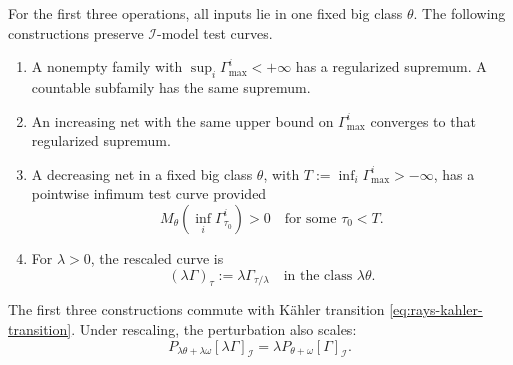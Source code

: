\begin{proposition}\label{prop:rays-test-limits}
For the first three operations, all inputs lie in one fixed big class
$\theta$. The following constructions preserve $\mathcal I$-model
test curves.
\begin{enumerate}
\item A nonempty family with
      $\sup_i\Gamma^i_{\max}<+\infty$ has a regularized supremum.
      A countable subfamily has the same supremum.
\item An increasing net with the same upper bound on
      $\Gamma^i_{\max}$ converges to that regularized supremum.
\item A decreasing net in a fixed big class $\theta$, with
      $T:=\inf_i\Gamma^i_{\max}>-\infty$, has a pointwise infimum
      test curve provided
      \[
       M_\theta\!\left(\inf_i\Gamma^i_{\tau_0}\right)>0
                    \quad\text{for some }\tau_0<T.
      \]
\item For $\lambda>0$, the rescaled curve is
      \[
      (\lambda\Gamma)_\tau
          :=\lambda\Gamma_{\tau/\lambda}
      \quad\text{in the class }\lambda\theta.
      \tag{52.26}\label{eq:rays-test-rescaling}
      \]
\end{enumerate}
The first three constructions commute with K\"ahler transition
\eqref{eq:rays-kahler-transition}. Under rescaling, the perturbation
also scales:
\[
 P_{\lambda\theta+\lambda\omega}[\lambda\Gamma]_{\mathcal I}
 =\lambda P_{\theta+\omega}[\Gamma]_{\mathcal I}.
\tag{52.26a}\label{eq:rays-rescaling-transition}
\]
\end{proposition}

